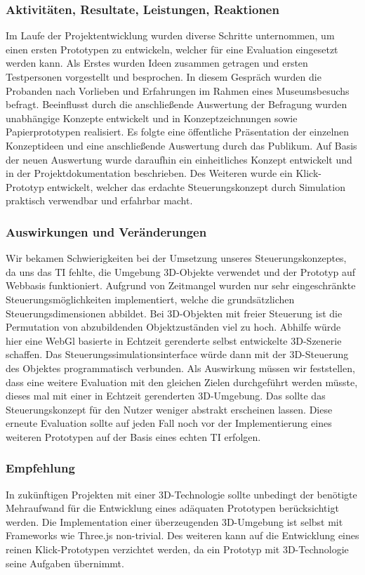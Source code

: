 \documentclass[runningheads,a4paper, 12pt]{llncs}
\begin{document}
\subsubsection{Aktivitäten, Resultate, Leistungen, Reaktionen}
Im Laufe der Projektentwicklung wurden diverse Schritte unternommen, um einen ersten Prototypen zu entwickeln, welcher für eine Evaluation eingesetzt werden kann.
Als Erstes wurden Ideen zusammen getragen und ersten Testpersonen vorgestellt und besprochen. In diesem Gespräch wurden die Probanden nach Vorlieben und Erfahrungen im Rahmen eines Museumsbesuchs befragt.
Beeinflusst durch die anschließende Auswertung der Befragung wurden unabhängige Konzepte entwickelt und in Konzeptzeichnungen sowie Papierprototypen realisiert.
Es folgte eine öffentliche Präsentation der einzelnen Konzeptideen und eine anschließende Auswertung durch das Publikum.
Auf Basis der neuen Auswertung wurde daraufhin ein einheitliches Konzept entwickelt und in der Projektdokumentation beschrieben. Des Weiteren wurde ein Klick-Prototyp entwickelt, welcher das erdachte Steuerungskonzept durch Simulation praktisch verwendbar und erfahrbar macht.
\subsubsection{Auswirkungen und Veränderungen}
Wir bekamen Schwierigkeiten bei der Umsetzung unseres Steuerungskonzeptes, da uns das TI fehlte, die Umgebung 3D-Objekte verwendet und der Prototyp auf Webbasis funktioniert. Aufgrund von Zeitmangel wurden nur sehr eingeschränkte Steuerungsmöglichkeiten implementiert, welche die grundsätzlichen Steuerungsdimensionen abbildet. Bei 3D-Objekten mit freier Steuerung ist die Permutation von abzubildenden Objektzuständen viel zu hoch. Abhilfe würde hier eine WebGl basierte in Echtzeit gerenderte selbst entwickelte 3D-Szenerie schaffen. Das Steuerungssimulationsinterface würde dann mit der 3D-Steuerung des Objektes programmatisch verbunden. Als Auswirkung müssen wir feststellen, dass eine weitere Evaluation mit den gleichen Zielen durchgeführt werden müsste, dieses mal mit einer in Echtzeit gerenderten 3D-Umgebung. Das sollte das Steuerungskonzept für den Nutzer weniger abstrakt erscheinen lassen. Diese erneute Evaluation sollte auf jeden Fall noch vor der Implementierung eines weiteren Prototypen auf der Basis eines echten TI erfolgen.
\subsubsection{Empfehlung}
In zukünftigen Projekten mit einer 3D-Technologie sollte unbedingt der benötigte Mehraufwand für die Entwicklung eines adäquaten Prototypen berücksichtigt werden. Die Implementation einer überzeugenden 3D-Umgebung ist selbst mit Frameworks wie Three.js non-trivial. Des weiteren kann auf die Entwicklung eines reinen Klick-Prototypen verzichtet werden, da ein Prototyp mit 3D-Technologie seine Aufgaben übernimmt. 
\end{document}
